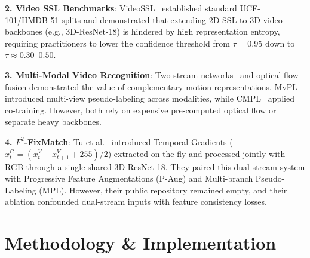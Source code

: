 \documentclass[10pt,twocolumn,a4paper]{article}
\begin{document}
\textbf{2. Video SSL Benchmarks}: VideoSSL~\cite{xiao2021videossl} established standard UCF-101/HMDB-51 splits and demonstrated that extending 2D SSL to 3D video backbones (e.g., 3D-ResNet-18) is hindered by high representation entropy, requiring practitioners to lower the confidence threshold from $\tau=0.95$ down to $\tau \approx 0.30$--$0.50$.

\textbf{3. Multi-Modal Video Recognition}: Two-stream networks~\cite{simonyan2014twostream} and optical-flow fusion demonstrated the value of complementary motion representations. MvPL~\cite{kim2022mvpl} introduced multi-view pseudo-labeling across modalities, while CMPL~\cite{yang2022cmpl} applied co-training. However, both rely on expensive pre-computed optical flow or separate heavy backbones.

\textbf{4. $F^2$-FixMatch}: Tu et al.~\cite{tu2025f2fixmatch} introduced Temporal Gradients ($x_t^G = (x_t^V - x_{t+1}^V + 255)/2$) extracted on-the-fly and processed jointly with RGB through a single shared 3D-ResNet-18. They paired this dual-stream system with Progressive Feature Augmentations (P-Aug) and Multi-branch Pseudo-Labeling (MPL). However, their public repository remained empty, and their ablation confounded dual-stream inputs with feature consistency losses.

\section{Methodology \& Implementation}
\label{sec:method}
\end{document}
